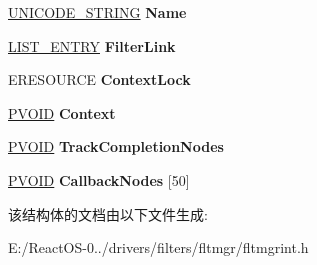 \begin{DoxyCompactItemize}
\hyperlink{struct___u_n_i_c_o_d_e___s_t_r_i_n_g}{U\+N\+I\+C\+O\+D\+E\+\_\+\+S\+T\+R\+I\+NG} {\bfseries Name}
\item 
\mbox{\label{struct___f_l_t___i_n_s_t_a_n_c_e_adc8e6d17f0c1b0d5802ab8544519a815}} 
\hyperlink{struct___l_i_s_t___e_n_t_r_y}{L\+I\+S\+T\+\_\+\+E\+N\+T\+RY} {\bfseries Filter\+Link}
\item 
\mbox{\label{struct___f_l_t___i_n_s_t_a_n_c_e_afab49542d9774724add0bc8fb3620116}} 
E\+R\+E\+S\+O\+U\+R\+CE {\bfseries Context\+Lock}
\item 
\mbox{\label{struct___f_l_t___i_n_s_t_a_n_c_e_a60958eec3097a3831143c9f45797293e}} 
\hyperlink{interfacevoid}{P\+V\+O\+ID} {\bfseries Context}
\item 
\mbox{\label{struct___f_l_t___i_n_s_t_a_n_c_e_ab5ce79c10befc6e01b68c21079b5d768}} 
\hyperlink{interfacevoid}{P\+V\+O\+ID} {\bfseries Track\+Completion\+Nodes}
\item 
\mbox{\label{struct___f_l_t___i_n_s_t_a_n_c_e_ae5c58f0fe949ad2792402b189badd1cb}} 
\hyperlink{interfacevoid}{P\+V\+O\+ID} {\bfseries Callback\+Nodes} \mbox{[}50\mbox{]}
\end{DoxyCompactItemize}


该结构体的文档由以下文件生成\+:\begin{DoxyCompactItemize}
\item 
E\+:/\+React\+O\+S-\/0../drivers/filters/fltmgr/fltmgrint.\+h\end{DoxyCompactItemize}
